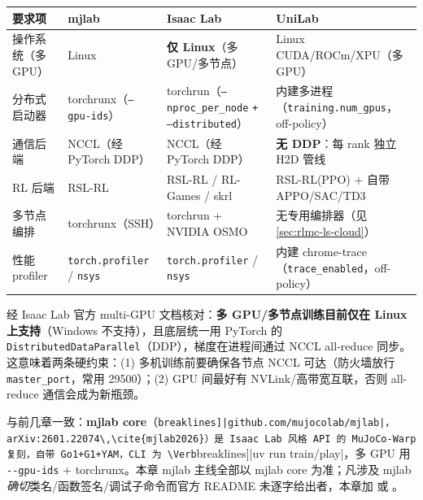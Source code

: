 \begin{center}
\small
\begin{tabular}{@{}p{3.0cm}p{3.5cm}p{3.8cm}p{2.6cm}@{}}
\toprule
要求项 & mjlab & Isaac Lab & UniLab \\
\midrule
操作系统（多 GPU） & Linux & \textbf{仅 Linux}（多 GPU/多节点） & Linux CUDA/ROCm/XPU（多 GPU） \\
分布式启动器 & torchrunx（\texttt{--gpu-ids}） & torchrun（\texttt{--nproc\_per\_node} \texttt{+ --distributed}） & 内建多进程（\texttt{training.\allowbreak num\_gpus}，off-policy） \\
通信后端 & NCCL（经 PyTorch DDP） & NCCL（经 PyTorch DDP） & \textbf{无 DDP}：每 rank 独立 H2D 管线 \\
RL 后端 & RSL-RL & RSL-RL / RL-Games / skrl & RSL-RL(PPO) + 自带 APPO/SAC/TD3 \\
多节点编排 & torchrunx（SSH） & torchrun + NVIDIA OSMO & 无专用编排器（见 \cref{sec:rlmc-ls-cloud}） \\
性能 profiler & \texttt{torch.\allowbreak profiler} / \texttt{nsys} & \texttt{torch.\allowbreak profiler} / \texttt{nsys} & 内建 chrome-trace（\texttt{trace\_enabled}，off-policy） \\
\bottomrule
\end{tabular}
\end{center}

\begin{note}
经 Isaac Lab 官方 multi-GPU 文档核对：\textbf{多 GPU/多节点训练目前仅在 Linux 上支持}（Windows 不支持），且底层统一用 PyTorch 的 \texttt{DistributedDataParallel}（DDP），梯度在进程间通过 NCCL all-reduce 同步\cite{mittal2025isaaclab}。这意味着两条硬约束：(1) 多机训练前要确保各节点 NCCL 可达（防火墙放行 \verb|master_port|，常用 29500）；(2) GPU 间最好有 NVLink/高带宽互联，否则 all-reduce 通信会成为新瓶颈。
\end{note}

\begin{note}
与前几章一致：\textbf{mjlab core}（\Verb[breaklines]|github.com/mujocolab/mjlab|，arXiv:2601.22074\,\cite{mjlab2026}）是 Isaac Lab 风格 API 的 MuJoCo-Warp 复刻，自带 Go1+G1+YAM，CLI 为 \Verb[breaklines]|uv run train/play|，多 GPU 用 \verb|--gpu-ids| + torchrunx\cite{schwarke2025rslrl}。本章 mjlab 主线全部以 mjlab core 为准；凡涉及 mjlab \emph{确切}类名/函数签名/调试子命令而官方 README 未逐字给出者，本章加 \rebuilt{} 或 。
\end{note}


